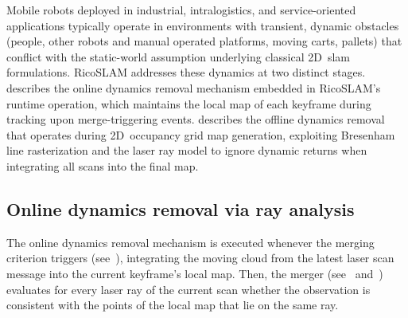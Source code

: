 Mobile robots deployed in industrial, intralogistics, and service-oriented
applications typically operate in environments with transient, dynamic obstacles
(people, other robots and manual operated platforms, moving carts, pallets) that
conflict with the static-world assumption underlying classical 2D~\gls{slam}
formulations. RicoSLAM addresses these dynamics at two distinct stages.
 describes the online dynamics removal
mechanism embedded in RicoSLAM's runtime operation, which maintains
the local map of each keyframe during tracking upon merge-triggering events.
 describes the offline dynamics removal that
operates during 2D~occupancy grid map generation, exploiting
Bresenham~\cite{bresenham:ibm:1965,zingl:uas:2016} line rasterization and
the laser ray model to ignore dynamic returns when integrating
all scans into the final map.

\subsection{Online dynamics removal via ray analysis}
\label{sec:slam:dynamics:online}

The online dynamics removal mechanism is executed whenever the merging criterion
triggers (see~), integrating
the moving cloud from the latest laser scan message into the current keyframe's
local map. Then, the merger (see~
and~) evaluates for every laser ray of
the current scan whether the observation is consistent with the points of
the local map that lie on the same ray.

